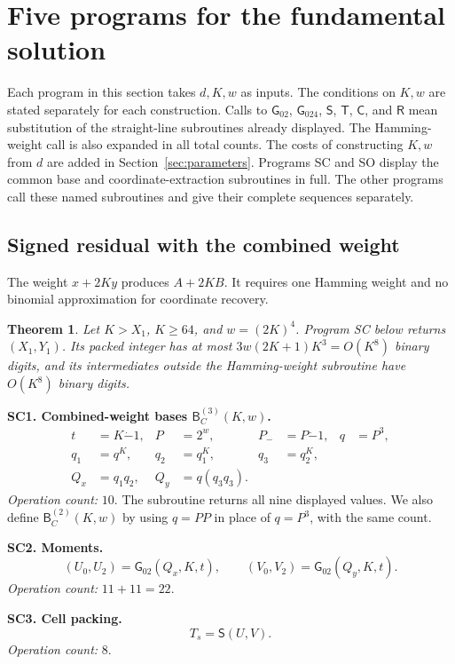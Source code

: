 \documentclass[11pt]{article}
\newtheorem{theorem}{Theorem}
\theoremstyle{remark}
\newcommand{\tsub}{\mathbin{\dot{-}}}
\newcommand{\Gpair}{\mathsf{G}_{02}}
\newcommand{\Gtriple}{\mathsf{G}_{024}}
\newcommand{\Recover}{\mathsf{R}}
\newcommand{\Coord}{\mathsf{C}}
\newcommand{\Signed}{\mathsf{S}}
\newcommand{\Squared}{\mathsf{T}}
\begin{document}
\section{Five programs for the fundamental solution}\label{sec:programs}

Each program in this section takes $d,K,w$ as inputs. The conditions on
$K,w$ are stated separately for each construction.
Calls to $\Gpair$, $\Gtriple$, $\Signed$, $\Squared$, $\Coord$, and
$\Recover$ mean substitution of the straight-line subroutines already
displayed. The Hamming-weight call is also expanded in all total counts.
The costs of constructing $K,w$ from $d$ are added in
Section~\ref{sec:parameters}. Programs SC and SO display the common
base and coordinate-extraction subroutines in full. The other programs
call these named subroutines and give their complete sequences separately.

\subsection{Signed residual with the combined weight}\label{sec:sc}

The weight $x+2Ky$ produces $A+2KB$. It requires one Hamming weight
and no binomial approximation for coordinate recovery.

\begin{theorem}\label{thm:sc}
Let $K>X_1$, $K\ge64$, and $w=(2K)^4$.
Program SC below returns $(X_1,Y_1)$.
Its packed integer has at most $3w(2K+1)K^3=O(K^8)$ binary digits,
and its intermediates outside the Hamming-weight subroutine have
$O(K^8)$ binary digits.
\end{theorem}

\textbf{SC1. Combined-weight bases $\mathsf B_C^{(3)}(K,w)$.}
\begin{align*}
  t&=K\tsub1,& P&=2^w,& P_-&=P\tsub1,& q&=P^3,\\
  q_1&=q^K,& q_2&=q_1^K,& q_3&=q_2^K,\\
  Q_x&=q_1q_2,& Q_y&=q(q_3q_3).&&
\end{align*}
\emph{Operation count:} $10$.
The subroutine returns all nine displayed values. We also define
$\mathsf B_C^{(2)}(K,w)$ by using $q=PP$ in place of $q=P^3$,
with the same count.

\textbf{SC2. Moments.}
\[
  (U_0,U_2)=\Gpair(Q_x,K,t),\qquad
  (V_0,V_2)=\Gpair(Q_y,K,t).
\]
\emph{Operation count:} $11+11=22$.

\textbf{SC3. Cell packing.}
\[
  T_s=\Signed(U,V).
\]
\emph{Operation count:} $8$.
\end{document}

